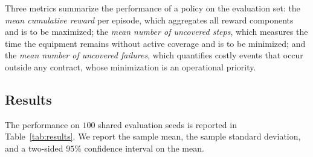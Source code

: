 Three metrics summarize the performance of a policy on the evaluation
set: the \emph{mean cumulative reward} per episode, which aggregates all
reward components and is to be maximized; the \emph{mean number of
uncovered steps}, which measures the time the equipment remains without
active coverage and is to be minimized; and the \emph{mean number of
uncovered failures}, which quantifies costly events that occur outside
any contract, whose minimization is an operational priority.


\subsection{Results}
\label{subsec:results}

The performance on $100$ shared evaluation seeds
is reported in Table~\ref{tab:results}. We report the sample mean, the
sample standard deviation, and a two-sided $95\%$ confidence interval on
the mean.

